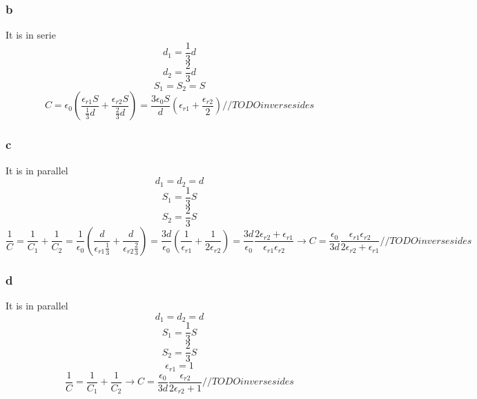\subsubsection{b}
It is in serie
\[
	d_1 = \frac{1}{3} d
\]
\[
	d_2 = \frac{2}{3} d
\]
\[
	S_1 = S_2 = S
\]
\[
	C = \epsilon_0
	( \frac{\epsilon_{r1} S}{\frac{1}{3} d} +
	\frac{\epsilon_{r2} S}{\frac{2}{3} d} )
	= \frac{3 \epsilon_0 S}{d}
	( \epsilon_{r1} + \frac{\epsilon_{r2}}{2} )
	// TODO inverse sides
\]

\subsubsection{c}
It is in parallel
\[
	d_1 = d_2 = d
\]
\[
	S_1 = \frac{1}{3} S
\]
\[
	S_2 = \frac{2}{3} S
\]
\[
	\frac{1}{C} = \frac{1}{C_1} + \frac{1}{C_2}
	= \frac{1}{\epsilon_0}
	( \frac{d}{\epsilon_{r1} \frac{1}{3}} +
	\frac{d}{\epsilon_{r2} \frac{2}{3}} )
	= \frac{3 d}{\epsilon_0}
	( \frac{1}{\epsilon_{r1}} +
	\frac{1}{2 \epsilon_{r2}} )
	= \frac{3 d}{\epsilon_0}
	\frac{2 \epsilon_{r2} + \epsilon_{r1}}{\epsilon_{r1} \epsilon_{r2}}
	\to C = \frac{\epsilon_0}{3 d}
	\frac{\epsilon_{r1} \epsilon_{r2}}{2 \epsilon_{r2} + \epsilon_{r1}}
	// TODO inverse sides
\]

\subsubsection{d}
It is in parallel
\[
	d_1 = d_2 = d
\]
\[
	S_1 = \frac{1}{3} S
\]
\[
	S_2 = \frac{2}{3} S
\]
\[
	\epsilon_{r1} = 1
\]
\[
	\frac{1}{C} = \frac{1}{C_1} + \frac{1}{C_2}
	\to C = \frac{\epsilon_0}{3 d}
	\frac{\epsilon_{r2}}{2 \epsilon_{r2} + 1}
	// TODO inverse sides
\]
